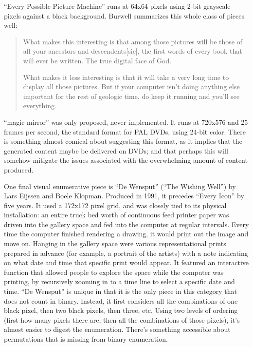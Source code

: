 \documentclass{thesis}
\begin{document}
	``Every Possible Picture Machine'' runs at 64x64 pixels using 2-bit grayscale pixels against a black background. Burwell summarizes this whole class of pieces well:
	
	\begin{quote}
	What makes this interesting is that among those pictures will be those of all your ancestors and descendents[sic], the first words of every book that will ever be written. The true digital face of God.

	What makes it less interesting is that it will take a very long time to display all those pictures. But if your computer isn't doing anything else important for the rest of geologic time, do keep it running and you'll see everything.
	\end{quote}
	
	``magic mirror'' was only proposed, never implemented. It runs at 720x576 and 25 frames per second, the standard format for PAL DVDs, using 24-bit color. There is something almost comical about suggesting this format, as it implies that the generated content maybe be delivered on DVDs; and that perhaps this will somehow mitigate the issues associated with the overwhelming amount of content produced.
	
	One final visual enumerative piece is ``De Wensput'' (``The Wishing Well'') by Lars Eijssen and Boele Klopman.\cite{remko_scha_every_2001} Produced in 1991, it precedes ``Every Icon'' by five years. It used a 172x172 pixel grid, and was closely tied to its physical installation: an entire truck bed worth of continuous feed printer paper was driven into the gallery space and fed into the computer at regular intervals. Every time the computer finished rendering a drawing, it would print out the image and move on. Hanging in the gallery space were various representational prints prepared in advance (for example, a portrait of the artists) with a note indicating on what date and time that specific print would appear. It featured an interactive function that allowed people to explore the space while the computer was printing, by recursively zooming in to a time line to select a specific date and time. ``De Wensput'' is unique in that it is the only piece in this category that does not count in binary. Instead, it first considers all the combinations of one black pixel, then two black pixels, then three, etc. Using two levels of ordering (first how many pixels there are, then all the combinations of those pixels), it's almost easier to digest the enumeration. There's something accessible about permutations that is missing from binary enumeration.
	
\end{document}
